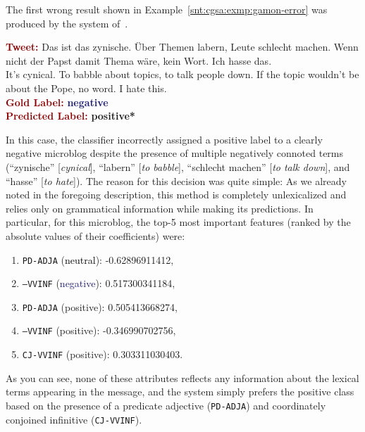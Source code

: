 The first wrong result shown in
Example~\ref{snt:cgsa:exmp:gamon-error} was produced by the system
of~\citet{Gamon:04}.
\begin{example}\label{snt:cgsa:exmp:mohammad-error}
  \noindent\textup{\bfseries\textcolor{darkred}{Tweet:}} {\upshape Das ist das zynische. \"Uber Themen labern, Leute schlecht machen. Wenn nicht der Papst damit Thema w\"are, kein Wort. Ich hasse das.}\\
  \noindent It's cynical.  To babble about topics, to talk people
  down.  If the topic wouldn't be about the Pope, no word. I
  hate this.\\[\exampleSep]
  \noindent\textup{\bfseries\textcolor{darkred}{Gold Label:}}\hspace*{4.3em}\textbf{%
    \upshape\textcolor{midnightblue}{negative}}\\
 \noindent\textup{\bfseries\textcolor{darkred}{Predicted Label:}}\hspace*{2em}\textbf{%
    \upshape\textcolor{green3}{positive*}}\label{snt:cgsa:exmp:gamon-error}
\end{example}
\noindent{} In this case, the classifier incorrectly assigned a
positive label to a clearly negative microblog despite the presence of
multiple negatively connoted terms (``zynische'' [\emph{cynical}],
``labern'' [\emph{to babble}], ``schlecht machen'' [\emph{to talk
    down}], and ``hasse'' [\emph{to hate}]).  The reason for this
decision was quite simple: As we already noted in the foregoing
description, this method is completely unlexicalized and relies only
on grammatical information while making its predictions.  In
particular, for this microblog, the top-5 most important features
(ranked by the absolute values of their coefficients) were:
\begin{enumerate}
\item \texttt{PD-ADJA} (\textcolor{black}{neutral}): -0.62896911412,
\item \texttt{---VVINF} (\textcolor{midnightblue}{negative}): 0.517300341184,
\item \texttt{PD-ADJA} (\textcolor{green3}{positive}): 0.505413668274,
\item \texttt{---VVINF} (\textcolor{green3}{positive}): -0.346990702756,
\item \texttt{CJ-VVINF} (\textcolor{green3}{positive}):
  0.303311030403.
\end{enumerate}
As you can see, none of these attributes reflects any information
about the lexical terms appearing in the message, and the system
simply prefers the positive class based on the presence of a predicate
adjective (\texttt{PD-ADJA}) and coordinately conjoined infinitive
(\texttt{CJ-VVINF}).

